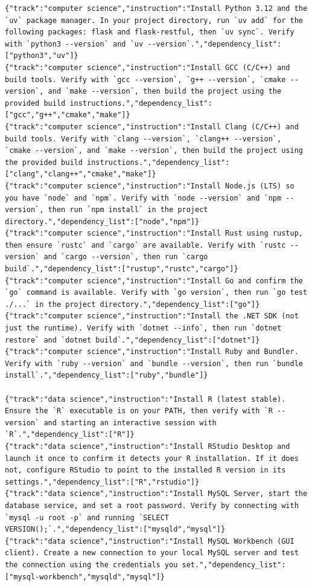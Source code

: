 \begin{lstlisting}[caption={Natural Language Instruction Benchmark Inputs}, label={lst:nl-instruction-inputs}]
{"track":"computer science","instruction":"Install Python 3.12 and the `uv` package manager. In your project directory, run `uv add` for the following packages: flask and flask-restful, then `uv sync`. Verify with `python3 --version` and `uv --version`.","dependency_list":["python3","uv"]}
{"track":"computer science","instruction":"Install GCC (C/C++) and build tools. Verify with `gcc --version`, `g++ --version`, `cmake --version`, and `make --version`, then build the project using the provided build instructions.","dependency_list":["gcc","g++","cmake","make"]}
{"track":"computer science","instruction":"Install Clang (C/C++) and build tools. Verify with `clang --version`, `clang++ --version`, `cmake --version`, and `make --version`, then build the project using the provided build instructions.","dependency_list":["clang","clang++","cmake","make"]}
{"track":"computer science","instruction":"Install Node.js (LTS) so you have `node` and `npm`. Verify with `node --version` and `npm --version`, then run `npm install` in the project directory.","dependency_list":["node","npm"]}
{"track":"computer science","instruction":"Install Rust using rustup, then ensure `rustc` and `cargo` are available. Verify with `rustc --version` and `cargo --version`, then run `cargo build`.","dependency_list":["rustup","rustc","cargo"]}
{"track":"computer science","instruction":"Install Go and confirm the `go` command is available. Verify with `go version`, then run `go test ./...` in the project directory.","dependency_list":["go"]}
{"track":"computer science","instruction":"Install the .NET SDK (not just the runtime). Verify with `dotnet --info`, then run `dotnet restore` and `dotnet build`.","dependency_list":["dotnet"]}
{"track":"computer science","instruction":"Install Ruby and Bundler. Verify with `ruby --version` and `bundle --version`, then run `bundle install`.","dependency_list":["ruby","bundle"]}

{"track":"data science","instruction":"Install R (latest stable). Ensure the `R` executable is on your PATH, then verify with `R --version` and starting an interactive session with `R`.","dependency_list":["R"]}
{"track":"data science","instruction":"Install RStudio Desktop and launch it once to confirm it detects your R installation. If it does not, configure RStudio to point to the installed R version in its settings.","dependency_list":["R","rstudio"]}
{"track":"data science","instruction":"Install MySQL Server, start the database service, and set a root password. Verify by connecting with `mysql -u root -p` and running `SELECT VERSION();`.","dependency_list":["mysqld","mysql"]}
{"track":"data science","instruction":"Install MySQL Workbench (GUI client). Create a new connection to your local MySQL server and test the connection using the credentials you set.","dependency_list":["mysql-workbench","mysqld","mysql"]}
\end{lstlisting}